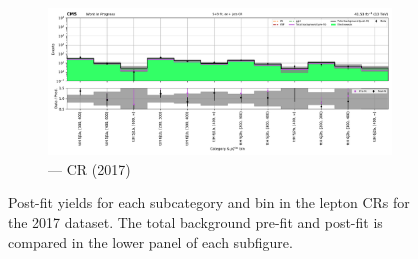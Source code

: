 \begin{figure}[htbp]
    \begin{subfigure}[b]{0.66\textwidth}
        \includegraphics[width=\textwidth]{chapters/higgstoinv/figures/mountain_ranges/2017/ttH/Zee_tree_fit_s-abs_values_ttH_cats.pdf}
        \caption{\ttH --- \doubleEleCr \gls{CR} (2017)}
    \end{subfigure}
    \caption[Post-fit yields for each \ttH subcategory and \ptmiss bin in the lepton control regions for the 2017 dataset]{Post-fit yields for each \ttH subcategory and \ptmiss bin in the lepton \glspl{CR} for the 2017 dataset. The total background pre-fit and post-fit is compared in the lower panel of each subfigure.}
    \label{fig:htoinv_mountain_range_ttH_2017_CRs}
\end{figure}

